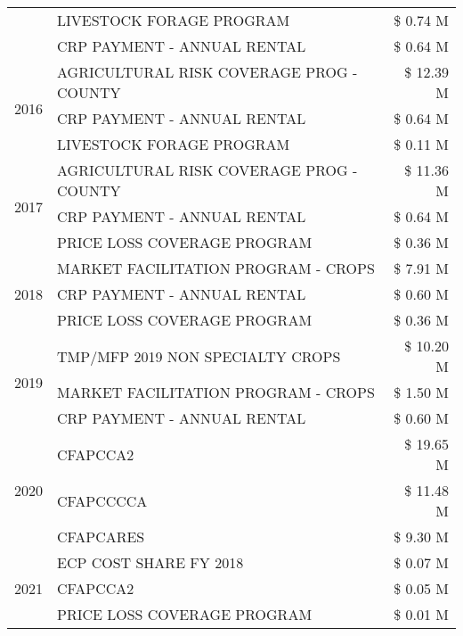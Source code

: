 \begin{tabular}{llr}
 & LIVESTOCK FORAGE PROGRAM & \$ 0.74 M \\
 & CRP PAYMENT - ANNUAL RENTAL & \$ 0.64 M \\
\cline{1-3}
\multirow[t]{3}{*}{2016} & AGRICULTURAL RISK COVERAGE PROG - COUNTY & \$ 12.39 M \\
 & CRP PAYMENT - ANNUAL RENTAL & \$ 0.64 M \\
 & LIVESTOCK FORAGE PROGRAM & \$ 0.11 M \\
\cline{1-3}
\multirow[t]{3}{*}{2017} & AGRICULTURAL RISK COVERAGE PROG - COUNTY & \$ 11.36 M \\
 & CRP PAYMENT - ANNUAL RENTAL & \$ 0.64 M \\
 & PRICE LOSS COVERAGE PROGRAM & \$ 0.36 M \\
\cline{1-3}
\multirow[t]{3}{*}{2018} & MARKET FACILITATION PROGRAM - CROPS & \$ 7.91 M \\
 & CRP PAYMENT - ANNUAL RENTAL & \$ 0.60 M \\
 & PRICE LOSS COVERAGE PROGRAM & \$ 0.36 M \\
\cline{1-3}
\multirow[t]{3}{*}{2019} & TMP/MFP 2019 NON SPECIALTY CROPS & \$ 10.20 M \\
 & MARKET FACILITATION PROGRAM - CROPS & \$ 1.50 M \\
 & CRP PAYMENT - ANNUAL RENTAL & \$ 0.60 M \\
\cline{1-3}
\multirow[t]{3}{*}{2020} & CFAPCCA2 & \$ 19.65 M \\
 & CFAPCCCCA & \$ 11.48 M \\
 & CFAPCARES & \$ 9.30 M \\
\cline{1-3}
\multirow[t]{3}{*}{2021} & ECP COST SHARE FY 2018 & \$ 0.07 M \\
 & CFAPCCA2 & \$ 0.05 M \\
 & PRICE LOSS COVERAGE PROGRAM & \$ 0.01 M \\
\cline{1-3}
\bottomrule
\end{tabular}

